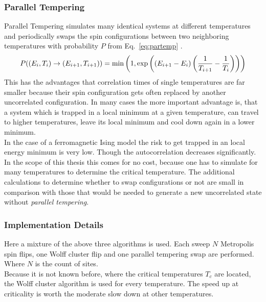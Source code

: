     \subsubsection{Parallel Tempering}
        Parallel Tempering\cite{ParallelTempering1986} simulates many identical systems at different
        temperatures and periodically swaps the spin configurations
        between two neighboring temperatures with probability \(P\) from
        Eq.\ \eqref{eq:partemp} \cite[p. 169ff]{NewmanBarkema1999} \cite[S. 155ff]{Katzgraber2011}.
        \begin{equation}
            P((E_i,T_i) \to (E_{i+1},T_{i+1})) = \min\left(1,\exp\left(\left(E_{i+1}-E_i\right)\left(\frac{1}{T_{i+1}}-\frac{1}{T_i}\right)\right)\right)
            \label{eq:partemp}
        \end{equation}
        This has the advantages that correlation times of single
        temperatures are far smaller because their spin configuration
        gets often replaced by another uncorrelated configuration. In
        many cases the more important advantage is, that a system which
        is trapped in a local minimum at a given temperature, can travel
        to higher temperatures, leave its local minimum and cool down
        again in a lower minimum.\\
        In the case of a ferromagnetic Ising model the risk to get trapped
        in an local energy minimum is very low. Though the autocorrelation
        decreases significantly. In the scope of this thesis this comes
        for no cost, because one has to simulate for many temperatures
        to determine the critical temperature. The additional calculations
        to determine whether to swap configurations or not are small in
        comparison with those that would be needed to generate a new
        uncorrelated state without \emph{parallel tempering}.

    \subsubsection{Implementation Details}
        Here a mixture of the above three algorithms is used.
        Each sweep \(N\) Metropolis spin flips, one Wolff cluster flip
        and one parallel tempering swap are performed. Where \(N\) is the
        count of sites.\\
        Because it is not known before, where the critical temperatures
        \(T_c\) are located, the Wolff cluster algorithm is used for
        every temperature. The speed up at criticality is worth the
        moderate slow down at other temperatures.

